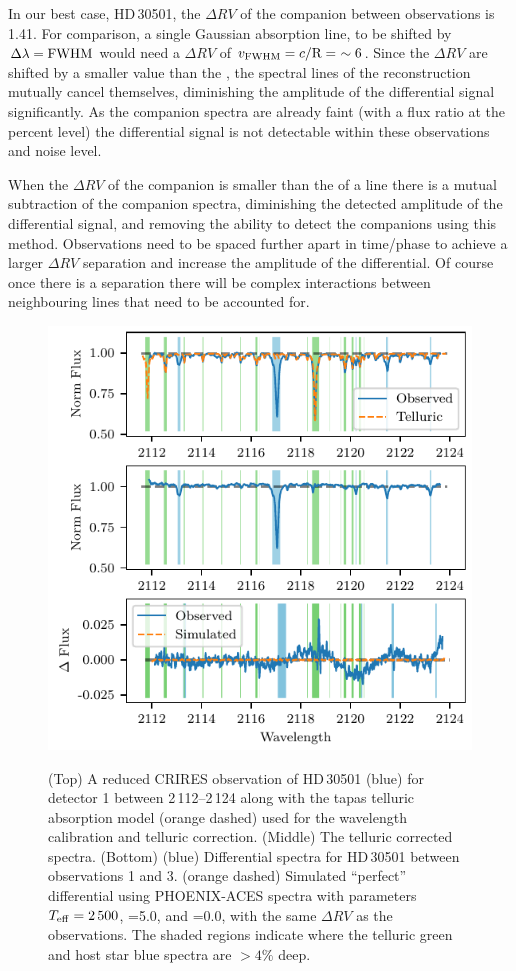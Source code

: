 In our best case, {HD\,30501}, the \(\Delta {RV}\) of the companion between observations is 1.41\kmps{}. For comparison, a single Gaussian absorption line, to be shifted by \(\Delta\lambda = {\textrm{FWHM}}\) would need a \(\Delta {RV}\) of \(v_{\textrm{FWHM}} = c/\textrm{R} =~\sim6\)\kmps{}. Since the \(\Delta {RV}\) are shifted by a smaller value than the {\fwhm}, the spectral lines of the reconstruction mutually cancel themselves, diminishing the amplitude of the differential signal significantly. As the companion spectra are already faint (with a flux ratio at the percent level) the differential signal is not detectable within these observations and noise level.

When the \(\Delta {RV}\) of the companion is smaller than the {\fwhm} of a line there is a mutual subtraction of the companion spectra, diminishing the detected amplitude of the differential signal, and removing the ability to detect the companions using this method. Observations need to be spaced further apart in time/phase to achieve a larger \(\Delta {RV}\) separation and increase the amplitude of the differential. Of course once there is a separation there will be complex interactions between neighbouring lines that need to be accounted for.

\begin{figure}
    \centering
    \includegraphics[width=0.8\hsize]{figures/direct-recovery/differential.pdf}\\
    \caption{(Top) A reduced {CRIRES} observation of {HD\,30501} (blue) for detector 1 between 2\,112--2\,124\nm{} along with the tapas telluric absorption model ({orange} dashed) used for the wavelength calibration and telluric correction.
        (Middle) The telluric corrected spectra.
        (Bottom) ({blue}) Differential spectra for {HD\,30501} between observations 1 and 3. ({orange} dashed) Simulated ``perfect'' differential using {PHOENIX-ACES} spectra with parameters \(T_{\mathrm{eff}}{}=2\,500\)\K{}, \logg{}=5.0, and \feh{}=0.0, with the same \(\Delta {RV}\) as the observations.
        The shaded regions indicate where the telluric {green} and host star {blue} spectra are \(> 4\%\) deep.}
    \label{fig:spectral_example}
\end{figure}

